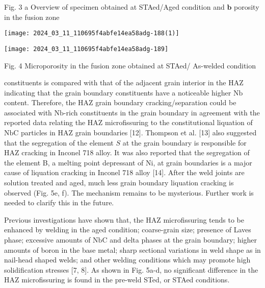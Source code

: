 \documentclass[10pt]{article}
\begin{document}
Fig. 3 a Overview of specimen obtained at STAed/Aged condition and $\mathbf{b}$ porosity in the fusion zone

\begin{center}
\texttt{[image: 2024\_03\_11\_110695f4abfe14ea58adg-188(1)]}
\end{center}

\begin{center}
\texttt{[image: 2024\_03\_11\_110695f4abfe14ea58adg-189]}
\end{center}

Fig. 4 Microporosity in the fusion zone obtained at STAed/ As-welded condition

constituents is compared with that of the adjacent grain interior in the HAZ indicating that the grain boundary constituents have a noticeable higher $\mathrm{Nb}$ content. Therefore, the HAZ grain boundary cracking/separation could be associated with $\mathrm{Nb}$-rich constituents in the grain boundary in agreement with the reported data relating the HAZ microfissuring to the constitutional liquation of $\mathrm{NbC}$ particles in HAZ grain boundaries [12]. Thompson et al. [13] also suggested that the segregation of the element $S$ at the grain boundary is responsible for HAZ cracking in Inconel 718 alloy. It was also reported that the segregation of the element B, a melting point depressant of $\mathrm{Ni}$, at grain boundaries is a major cause of liquation cracking in Inconel 718 alloy [14]. After the weld joints are solution treated and aged, much less grain boundary liquation cracking is observed (Fig. 5e, f). The mechanism remains to be mysterious. Further work is needed to clarify this in the future.

Previous investigations have shown that, the HAZ microfissuring tends to be enhanced by welding in the aged condition; coarse-grain size; presence of Laves phase; excessive amounts of $\mathrm{NbC}$ and delta phases at the grain boundary; higher amounts of boron in the base metal; sharp sectional variations in weld shape as in nail-head shaped welds; and other welding conditions which may promote high solidification stresses [7, 8]. As shown in Fig. 5a-d, no significant difference in the HAZ microfissuring is found in the pre-weld STed, or STAed conditions.
\end{document}
